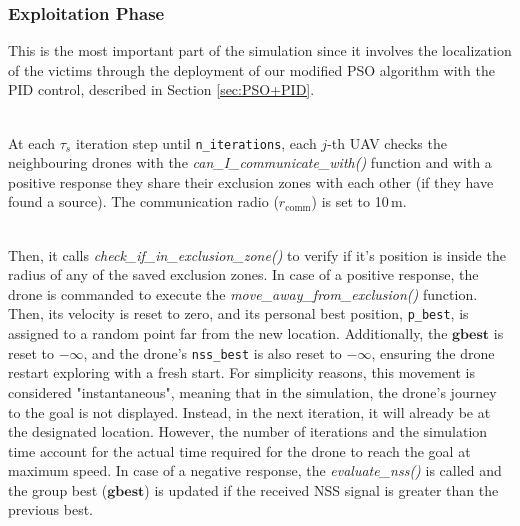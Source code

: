 
\subsubsection{Exploitation Phase}
This is the most important part of the simulation since it involves
the localization of the victims through the deployment of our modified PSO
algorithm with the PID control, described in Section \ref{sec:PSO+PID}.

\noindent\\
At each $\tau_s$ iteration step until \texttt{n\_iterations},
each $j$-th UAV checks the neighbouring drones with the
\textit{can\_I\_communicate\_with()} function and with a 
positive response they share their exclusion zones with each other
(if they have found a source). The communication radio (\(r_{\text{comm}}\))
is set to 10\,m.

\noindent\\
Then, it calls \textit{check\_if\_in\_exclusion\_zone()}
to verify if it's position is inside the radius of any of the 
saved exclusion zones.
In case of a positive response, the drone is commanded to 
execute the \textit{move\_away\_from\_exclusion()} function. 
Then, its velocity is reset to zero, and its personal 
best position, \texttt{p\_best}, is assigned to a random point 
far from the new location. Additionally, the $\mathbf{gbest}$ 
is reset to \(-\infty\), and the 
drone's \texttt{nss\_best} is also reset to \(-\infty\), 
ensuring the drone restart exploring with a fresh start.
For simplicity reasons, this movement is considered "instantaneous", 
meaning that in the simulation, the drone's journey to the goal is 
not displayed. Instead, in the next iteration, it will already 
be at the designated location. However, the number of 
iterations and the simulation time account for the actual 
time required for the drone to reach the goal at maximum speed.
In case of a negative response, the \textit{evaluate\_nss()} is 
called and the group best ($\mathbf{gbest}$) is updated if the received NSS signal 
is greater than the previous best.

